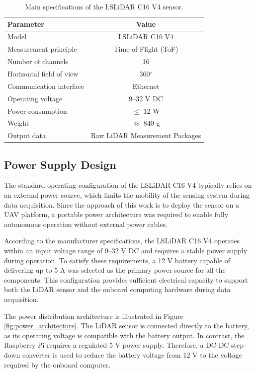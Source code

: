 \begin{table}[H]
\centering
\caption{Main specifications of the LSLiDAR C16 V4 sensor.}
\label{tab:c16_specs}
\begin{tabular}{|l|c|}
\hline
\textbf{Parameter} & \textbf{Value} \\
\hline
Model & LSLiDAR C16 V4 \\
\hline
Measurement principle & Time-of-Flight (ToF) \\
\hline
Number of channels & 16 \\
\hline
Horizontal field of view & 360$^\circ$ \\
\hline
Communication interface & Ethernet \\
\hline
Operating voltage & 9--32 V DC \\
\hline
Power consumption & $\leq$ 12 W \\
\hline
Weight & $\approx$ 840 g \\
\hline
Output data & Raw LiDAR Measurement Packages \\
\hline
\end{tabular}
\end{table}


\subsection{Power Supply Design}
\label{subsec:power_supply}


The standard operating configuration of the LSLiDAR C16 V4 typically relies on an external power source, which limits the mobility of the sensing system during data acquisition. Since the approach of this work is to deploy the sensor on a UAV platform, a portable power architecture was required to enable fully autonomous operation without external power cables.

According to the manufacturer specifications, the LSLiDAR C16 V4 operates within an input voltage range of 9--32 V DC and requires a stable power supply during operation. To satisfy these requirements, a 12 V battery capable of delivering up to 5 A was selected as the primary power source for all the components. This configuration provides sufficient electrical capacity to support both the LiDAR sensor and the onboard computing hardware during data acquisition.

The power distribution architecture is illustrated in Figure \ref{fig:power_architecture}. The LiDAR sensor is connected directly to the battery, as its operating voltage is compatible with the battery output. In contrast, the Raspberry Pi requires a regulated 5 V power supply. Therefore, a DC-DC step-down converter is used to reduce the battery voltage from 12 V to the voltage required by the onboard computer.

